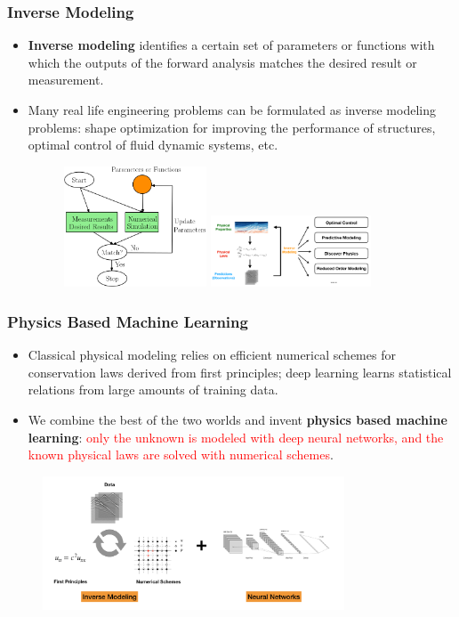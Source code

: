 \documentclass{beamer}
\begin{document}
\begin{frame}
	\frametitle{Inverse Modeling}
	\begin{itemize}
		\item \textbf{Inverse modeling} identifies a certain set of parameters or functions with which the outputs of the forward analysis matches the desired result or measurement.
		\item Many real life engineering problems can be formulated as inverse modeling problems: shape optimization for improving the performance of structures, optimal control of fluid dynamic systems, etc.
		\begin{figure}[hbt]
  \includegraphics[width=0.4\textwidth]{../im.png}
  \includegraphics[width=0.45\textwidth]{../inverse2}
\end{figure}

	\end{itemize}
\end{frame}

\begin{frame}
	\frametitle{Physics Based Machine Learning}
	\begin{itemize}
		\item Classical physical modeling relies on efficient numerical schemes for conservation laws derived from first principles; deep learning learns statistical relations from large amounts of training data.
		\item We combine the best of the two worlds and invent \textbf{physics based machine learning}: \textcolor{red}{only the unknown is modeled with deep neural networks, and the known physical laws are solved with numerical schemes}.
	\end{itemize}
	\begin{figure}[hbt]
  \includegraphics[width=0.8\textwidth]{../physics_based_machine_learning.png}
\end{figure}
\end{frame}
\end{document}
